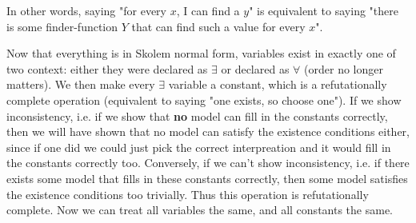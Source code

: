 \documentclass{article}
\begin{document}
In other words, saying "for every $x$, I can find a $y$" is equivalent to saying "there is some finder-function $Y$ that can find such a value for every $x$".

Now that everything is in Skolem normal form, variables exist in exactly one of two context: either they were declared as $\exists$ or declared as $\forall$ (order no longer matters). We then make every $\exists$ variable a constant, which is a refutationally complete operation (equivalent to saying "one exists, so choose one"). If we show inconsistency, i.e. if we show that \textbf{no} model can fill in the constants correctly, then we will have shown that no model can satisfy the existence conditions either, since if one did we could just pick the correct interpreation and it would fill in the constants correctly too. Conversely, if we can't show inconsistency, i.e. if there exists some model that fills in these constants correctly, then some model satisfies the existence conditions too trivially. Thus this operation is refutationally complete. Now we can treat all variables the same, and all constants the same.
\end{document}
